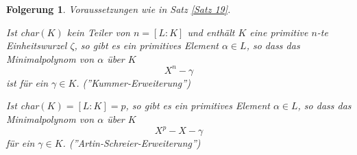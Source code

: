 \documentclass[a4paper,10pt,german]{scrbook}
\theoremstyle{saetze}
\theoremstyle{definitionen}
\newtheorem{Folg}[Def]{Folgerung}
\begin{document}
\begin{Folg}
Voraussetzungen wie in Satz \ref{Satz 19}.
\begin{enum}

\item Ist char$(K)$ kein Teiler von $n=[L:K]$ und enthält $K$ eine
primitive $n$-te Einheitswurzel $\zeta$, so gibt es ein primitives
Element $\alpha \in L$, so dass das Minimalpolynom von $\alpha$ über
$K$ \[X^n - \gamma\] ist für ein $\gamma \in K$.
(\textit{''Kummer-Erweiterung''})

\item Ist char$(K) = [L:K] = p$, so gibt es ein primitives Element
$\alpha \in L$, so dass das Minimalpolynom von $\alpha$ über $K$
\[ X^p - X - \gamma\] für ein $\gamma \in K$.
(\textit{''Artin-Schreier-Erweiterung''})

\end{enum}
\end{Folg}
\end{document}
